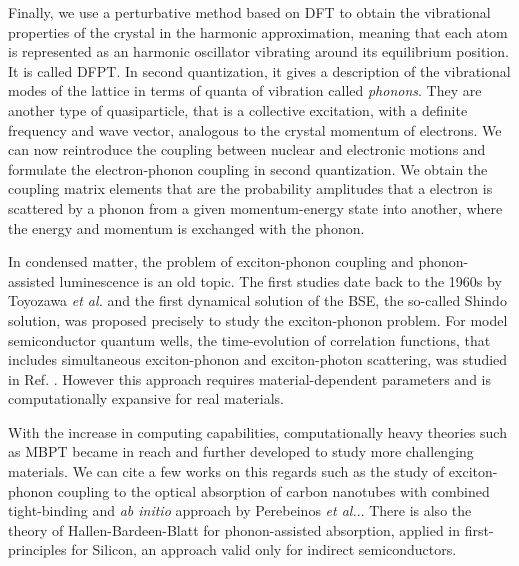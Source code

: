 Finally, we use a perturbative method based on \acrshort{DFT} to obtain the vibrational properties of the crystal in the harmonic approximation, meaning that each atom is represented as an harmonic oscillator vibrating around its equilibrium position. It is called \acrfull{DFPT}.\cite{baroni2001phonons} In second quantization, it gives a description of the vibrational modes of the lattice in terms of quanta of vibration called \textit{phonons}. They are another type of quasiparticle, that is a collective excitation, with a definite frequency and wave vector, analogous to the crystal momentum of electrons. We can now reintroduce the coupling between nuclear and electronic motions and formulate the electron-phonon coupling in second quantization. We obtain the coupling matrix elements that are the probability amplitudes that a electron is scattered by a phonon from a given momentum-energy state into another, where the energy and momentum is exchanged with the phonon.  


In condensed matter, the problem of exciton-phonon coupling and phonon-assisted luminescence is an old topic. The first studies date back to the 1960s by Toyozawa \emph{et al.}\cite{toyozawa2003optical,toyozawa1964interband} and the first dynamical solution of the \acrshort{BSE}, the so-called Shindo solution, was proposed precisely to study the exciton-phonon problem.\cite{shindo1970effective}
For model semiconductor quantum wells, the time-evolution of correlation functions, that includes simultaneous exciton-phonon and exciton-photon scattering, was studied in Ref. \cite{thranhardt2000quantum}. However this approach requires material-dependent parameters and is computationally expansive for real materials.

With the increase in computing capabilities, computationally heavy theories such as \acrshort{MBPT} became in reach and further developed to study more challenging materials. We can cite a few works on this regards such as the study of exciton-phonon coupling to the optical absorption of carbon nanotubes with combined tight-binding and \textit{ab initio} approach by Perebeinos \textit{et al.}.\cite{perebeinos2005effect}. There is also the theory of Hallen-Bardeen-Blatt for phonon-assisted absorption, \cite{hall1954infrared} applied in first-principles for Silicon,\cite{noffsinger2012phonon} an approach valid only for indirect semiconductors. 


